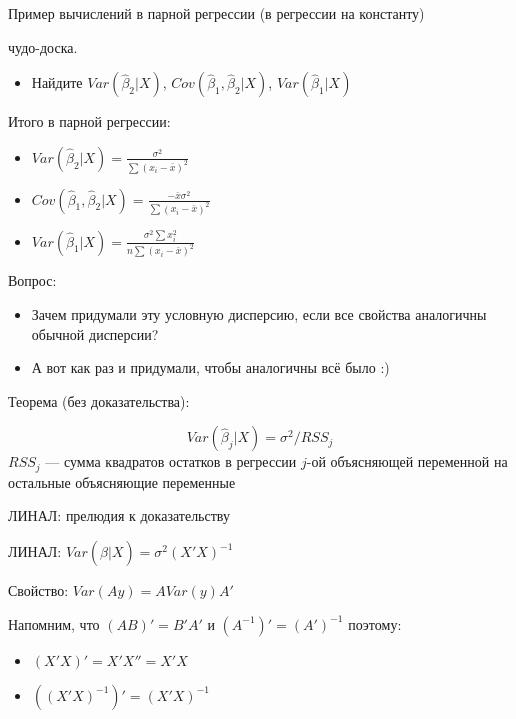 \documentclass[ignorenonframetext,]{beamer}
\begin{document}
\begin{frame}{Пример вычислений в парной регрессии (в регрессии на
константу)}

чудо-доска.

\begin{itemize}
\itemsep1pt\parskip0pt
\item
  Найдите $Var(\hat{\beta}_2|X)$, $Cov(\hat{\beta}_1,\hat{\beta}_2 |X)$,
  $Var(\hat{\beta}_1|X)$
\end{itemize}

\end{frame}

\begin{frame}{Итого в парной регрессии:}

\begin{itemize}
\item
  $Var(\hat{\beta}_2|X)=\frac{\sigma^2}{\sum (x_i-\bar{x})^2}$
\item
  $Cov(\hat{\beta}_1,\hat{\beta}_2 |X)=\frac{-\bar{x}\sigma^2}{\sum (x_i-\bar{x})^2}$
\item
  $Var(\hat{\beta}_1|X)=\frac{\sigma^2 \sum x_i^2}{n\sum (x_i-\bar{x})^2}$
\end{itemize}

\end{frame}

\begin{frame}{Вопрос:}

\begin{itemize}
\item
  Зачем придумали эту условную дисперсию, если все свойства аналогичны
  обычной дисперсии?
\item
  А вот как раз и придумали, чтобы аналогичны всё было :)
\end{itemize}

\end{frame}

\begin{frame}{Теорема (без доказательства):}

\[
Var(\hat{\beta}_j| X)=\sigma^2/RSS_j
\] $RSS_j$ --- сумма квадратов остатков в регрессии $j$-ой объясняющей
переменной на остальные объясняющие переменные

\end{frame}

\begin{frame}{ЛИНАЛ: прелюдия к доказательству}

ЛИНАЛ: $Var(\hat{\beta}|X)=\sigma^2 (X'X)^{-1}$

Свойство: $Var(Ay)=AVar(y)A'$

Напомним, что $(AB)'=B'A'$ и $(A^{-1})'=(A')^{-1}$ поэтому:

\begin{itemize}
\item
  $(X'X)'=X'X''=X'X$
\item
  $((X'X)^{-1})'=(X'X)^{-1}$
\end{itemize}

\end{frame}
\end{document}
